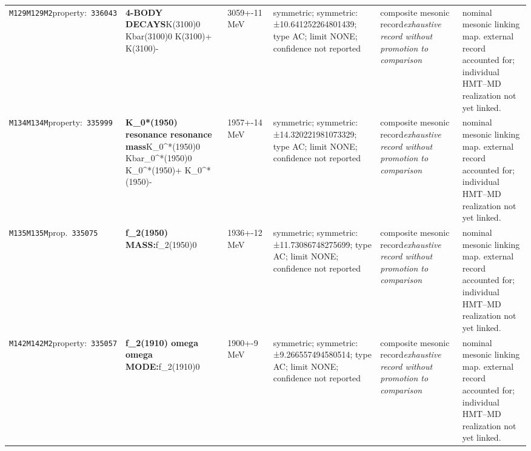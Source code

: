 \begin{landscape}
\begin{longtable}{L{1.85cm}L{4.45cm}L{2.35cm}L{4.05cm}L{3.35cm}L{7.15cm}}
\texttt{M129}\newline \texttt{M129M2}\newline property:\ \texttt{336043} & \textbf{4-BODY DECAYS}\newline K(3100)0 \textbar{}\allowbreak{} Kbar(3100)0 \textbar{}\allowbreak{} K(3100)+ \textbar{}\allowbreak{} K(3100)- & 3059+-11\,MeV & symmetric; symmetric: ±10.641252264801439; type AC; limit NONE; confidence not reported & composite mesonic record\newline \emph{exhaustive record without promotion to comparison} & nominal mesonic linking map. external record accounted for; individual HMT--MD realization not yet linked. \\
\texttt{M134}\newline \texttt{M134M}\newline property:\ \texttt{335999} & \textbf{K\_\allowbreak{}0*(1950) resonance resonance mass}\newline K\_\allowbreak{}0\textasciicircum{}*(1950)0 \textbar{}\allowbreak{} Kbar\_\allowbreak{}0\textasciicircum{}*(1950)0 \textbar{}\allowbreak{} K\_\allowbreak{}0\textasciicircum{}*(1950)+ \textbar{}\allowbreak{} K\_\allowbreak{}0\textasciicircum{}*(1950)- & 1957+-14\,MeV & symmetric; symmetric: ±14.320221981073329; type AC; limit NONE; confidence not reported & composite mesonic record\newline \emph{exhaustive record without promotion to comparison} & nominal mesonic linking map. external record accounted for; individual HMT--MD realization not yet linked. \\
\texttt{M135}\newline \texttt{M135M}\newline prop.\ \texttt{335075} & \textbf{f\_\allowbreak{}2(1950) MASS:}\newline f\_\allowbreak{}2(1950)0 & 1936+-12\,MeV & symmetric; symmetric: ±11.73086748275699; type AC; limit NONE; confidence not reported & composite mesonic record\newline \emph{exhaustive record without promotion to comparison} & nominal mesonic linking map. external record accounted for; individual HMT--MD realization not yet linked. \\
\texttt{M142}\newline \texttt{M142M2}\newline property:\ \texttt{335057} & \textbf{f\_\allowbreak{}2(1910) omega omega MODE:}\newline f\_\allowbreak{}2(1910)0 & 1900+-9\,MeV & symmetric; symmetric: ±9.266557494580514; type AC; limit NONE; confidence not reported & composite mesonic record\newline \emph{exhaustive record without promotion to comparison} & nominal mesonic linking map. external record accounted for; individual HMT--MD realization not yet linked. \\

\end{longtable}
\end{landscape}
